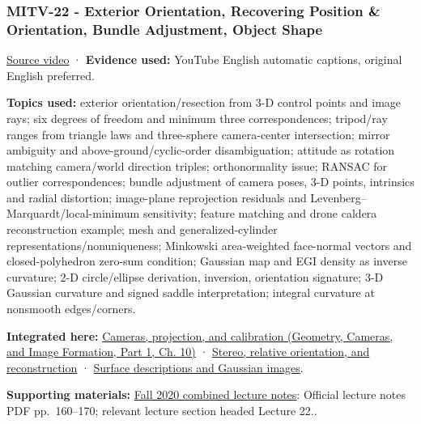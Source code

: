 \subsubsection{MITV-22 - Exterior Orientation, Recovering Position \& Orientation, Bundle Adjustment, Object Shape}\label{04-visual-computing-ii-ch036-mitv-22---exterior-orientation-recovering-position-orientation-bundle-adjustment-object-shape}

\hypertarget{04-visual-computing-ii-ch036-mitv-22---exterior-orientation-recovering-position-orientation-bundle-adjustment-object-shape}{}

\href{https://www.youtube.com/watch?v=x4F1oqm7ETk}{Source video} · \textbf{Evidence used:} YouTube English automatic captions, original English preferred.

\textbf{Topics used:} exterior orientation/resection from 3-D control points and image rays; six degrees of freedom and minimum three correspondences; tripod/ray ranges from triangle laws and three-sphere camera-center intersection; mirror ambiguity and above-ground/cyclic-order disambiguation; attitude as rotation matching camera/world direction triples; orthonormality issue; RANSAC for outlier correspondences; bundle adjustment of camera poses, 3-D points, intrinsics and radial distortion; image-plane reprojection residuals and Levenberg--Marquardt/local-minimum sensitivity; feature matching and drone caldera reconstruction example; mesh and generalized-cylinder representations/nonuniqueness; Minkowski area-weighted face-normal vectors and closed-polyhedron zero-sum condition; Gaussian map and EGI density as inverse curvature; 2-D circle/ellipse derivation, inversion, orientation signature; 3-D Gaussian curvature and signed saddle interpretation; integral curvature at nonsmooth edges/corners.

\textbf{Integrated here:} \href{../03-Geometry-Cameras-and-Image-Formation-P01/main.pdf\#nameddest=03-visual-computing-i-ch003-cameras-projection-and-calibration}{Cameras, projection, and calibration (Geometry, Cameras, and Image Formation, Part 1, Ch. 10)} · \hyperref[04-visual-computing-ii-ch032-stereo-relative-orientation-and-reconstruction]{Stereo, relative orientation, and reconstruction} · \hyperref[04-visual-computing-ii-ch032-surface-descriptions-and-gaussian-images]{Surface descriptions and Gaussian images}.

\textbf{Supporting materials:} \href{https://ocw.mit.edu/courses/6-801-machine-vision-fall-2020/9ec44f69e72995c370b3797818ba01e6_MIT6_801F20_lectureNotes.pdf}{Fall 2020 combined lecture notes}: Official lecture notes PDF pp.~160--170; relevant lecture section headed Lecture 22..

